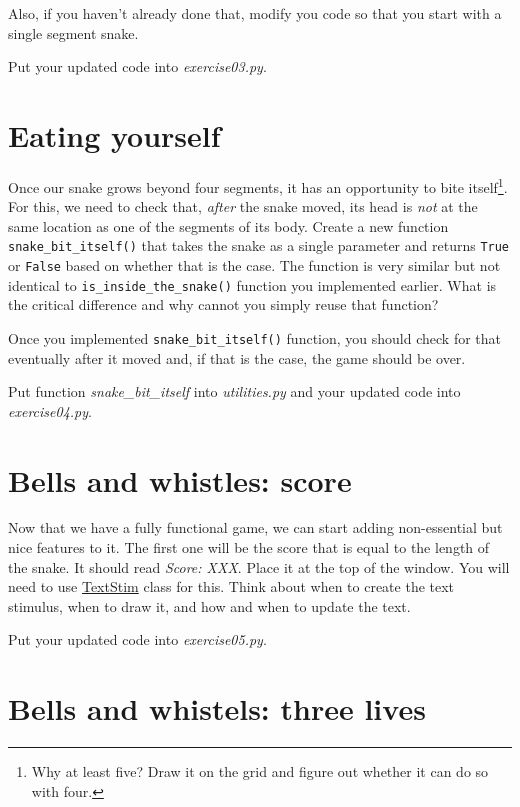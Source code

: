 \documentclass[
]{book}
\begin{document}
Also, if you haven't already done that, modify you code so that you start with a single segment snake.

Put your updated code into \emph{exercise03.py}.

\hypertarget{eating-yourself}{%
\section{Eating yourself}\label{eating-yourself}}

Once our snake grows beyond four segments, it has an opportunity to bite itself\footnote{Why at least five? Draw it on the grid and figure out whether it can do so with four.}. For this, we need to check that, \emph{after} the snake moved, its head is \emph{not} at the same location as one of the segments of its body. Create a new function \texttt{snake\_bit\_itself()} that takes the snake as a single parameter and returns \texttt{True} or \texttt{False} based on whether that is the case. The function is very similar but not identical to \texttt{is\_inside\_the\_snake()} function you implemented earlier. What is the critical difference and why cannot you simply reuse that function?

Once you implemented \texttt{snake\_bit\_itself()} function, you should check for that eventually after it moved and, if that is the case, the game should be over.

Put function \emph{snake\_bit\_itself} into \emph{utilities.py} and your updated code into \emph{exercise04.py}.

\hypertarget{bells-and-whistles-score}{%
\section{Bells and whistles: score}\label{bells-and-whistles-score}}

Now that we have a fully functional game, we can start adding non-essential but nice features to it. The first one will be the score that is equal to the length of the snake. It should read \emph{Score: XXX}. Place it at the top of the window. You will need to use \href{https://www.psychopy.org/api/visual/textstim.html\#psychopy.visual.TextStim}{TextStim} class for this. Think about when to create the text stimulus, when to draw it, and how and when to update the text.

Put your updated code into \emph{exercise05.py}.

\hypertarget{bells-and-whistels-three-lives}{%
\section{Bells and whistels: three lives}\label{bells-and-whistels-three-lives}}
\end{document}
